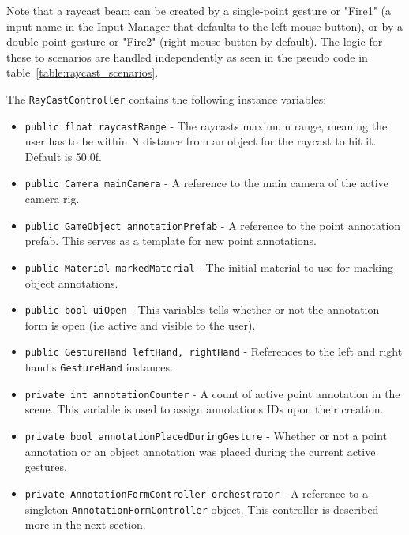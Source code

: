 Note that a raycast beam can be created by a single-point gesture or "Fire1" (a input name in the Input Manager that defaults to the left mouse button), or 
by a double-point gesture or "Fire2" (right mouse button by default). The logic for these to scenarios are handled independently as seen in the pseudo code in 
table~\vref{table:raycast_scenarios}. %

The \texttt{RayCastController} contains the following instance variables:
\begin{itemize}
\item \texttt{public float raycastRange} - The raycasts maximum range, meaning the user has to be within N distance from an object for the raycast to hit it. Default is 50.0f.                             
\item \texttt{public Camera mainCamera} - A reference to the main camera of the active camera rig.                                       
\item \texttt{public GameObject annotationPrefab} - A reference to the point annotation prefab. This serves as a template for new point annotations.
\item \texttt{public Material markedMaterial} - The initial material to use for marking object annotations.
\item \texttt{public bool uiOpen} - This variables tells whether or not the annotation form is open (i.e active and visible to the user).
\item \texttt{public GestureHand leftHand, rightHand} - References to the left and right hand's \texttt{GestureHand} instances.
\item \texttt{private int annotationCounter} - A count of active point annotation in the scene. This variable is used to assign annotations IDs upon their creation.
\item \texttt{private bool annotationPlacedDuringGesture} - Whether or not a point annotation or an object annotation was placed during the current active gestures. 
\item \texttt{private AnnotationFormController orchestrator} - A reference to a singleton \texttt{AnnotationFormController} object. 
        This controller is described more in the next section.
\end{itemize}

